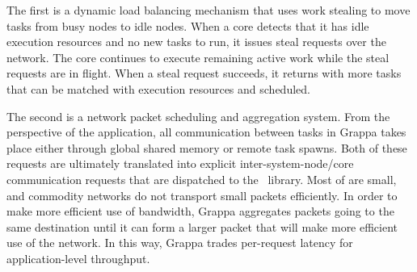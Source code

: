 The first is a dynamic load balancing mechanism that uses work stealing to
move tasks from busy nodes to idle nodes. When a core detects that it
has idle execution resources and no new tasks to run, it issues steal
requests over the network. The core continues to execute remaining
active work while the steal requests are in flight. When a steal
request succeeds, it returns with more tasks that can be matched with
execution resources and scheduled.

The second is a network packet scheduling and aggregation system. From
the perspective of the application, all communication between tasks in
Grappa takes place either through global shared memory or remote task
spawns. Both of these requests are ultimately translated into explicit
inter-system-node/core communication requests that are dispatched to
the \gasnet~library. Most of  are small, and commodity
networks do not transport small packets efficiently. In order to make
more efficient use of bandwidth, Grappa aggregates packets going to the
same destination until it can form a larger packet that will make more
efficient use of the network. In this way, Grappa trades per-request
latency for application-level throughput.
